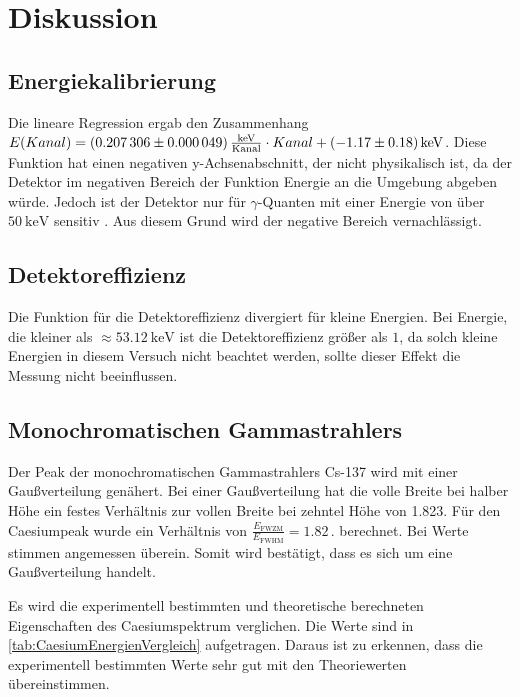 \section{Diskussion}
\label{sec:Diskussion}


\subsection{Energiekalibrierung}

Die lineare Regression ergab den Zusammenhang $E(Kanal) = \SI{0.207306 \pm 0.000049}{\frac{\kilo\eV}{\text{Kanal}}} \cdot Kanal + \SI{-1.17 \pm 0.18}{\kilo\eV}$.
Diese Funktion hat einen negativen y-Achsenabschnitt, der nicht physikalisch ist, da der Detektor im negativen Bereich der Funktion Energie an die Umgebung abgeben würde.
Jedoch ist der Detektor nur für $\gamma$-Quanten mit einer Energie von über $\SI{50}{\kilo\eV}$ sensitiv \cite{v18}.
Aus diesem Grund wird der negative Bereich vernachlässigt.


\subsection{Detektoreffizienz}

Die Funktion für die Detektoreffizienz divergiert für kleine Energien.
Bei Energie, die kleiner als $\approx \SI{53.12}{\kilo\eV}$ ist die Detektoreffizienz größer als $1$, 
da solch kleine Energien in diesem Versuch nicht beachtet werden, sollte dieser Effekt die Messung nicht beeinflussen.


\subsection{Monochromatischen Gammastrahlers}

Der Peak der monochromatischen Gammastrahlers Cs-137 wird mit einer Gaußverteilung genähert.
Bei einer Gaußverteilung hat die volle Breite bei halber Höhe ein festes Verhältnis zur vollen Breite bei zehntel Höhe von 1.823.
Für den Caesiumpeak wurde ein Verhältnis von $\frac{E_{\text{FWZM}}}{E_{\text{FWHM}}} = 1.82\,.$ berechnet.
Bei Werte stimmen angemessen überein. Somit wird bestätigt, dass es sich um eine Gaußverteilung handelt.


Es wird die experimentell bestimmten und theoretische berechneten Eigenschaften des Caesiumspektrum verglichen.
Die Werte sind in \autoref{tab:CaesiumEnergienVergleich} aufgetragen. Daraus ist zu erkennen, dass die experimentell bestimmten Werte sehr gut mit den Theoriewerten übereinstimmen.

